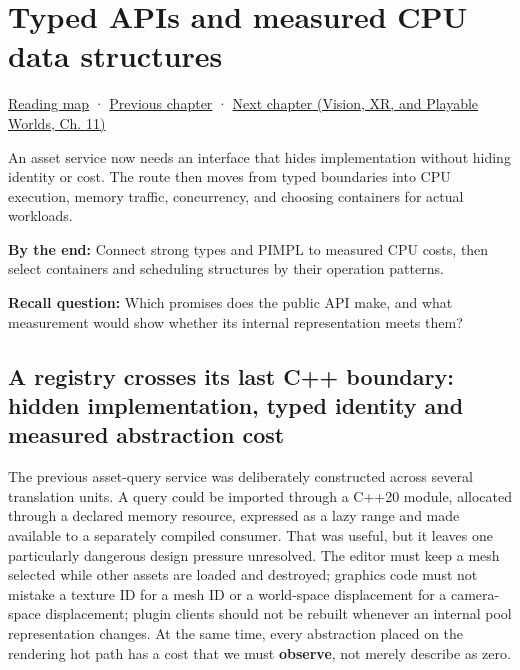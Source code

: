 \chapter{Typed APIs and measured CPU data structures}\label{05-engine-i-ch007-typed-apis-and-measured-cpu-data-structures}\hypertarget{05-engine-i-ch007}{}\label{stagechapter:05-engine-i-ch007}

\hyperref[volume-reading-map]{Reading map} · \hyperref[05-engine-i-ch006-queries-lazy-ranges-allocators-and-module-boundaries]{Previous chapter} · \href{../07-Vision-XR-and-Playable-Worlds/main.pdf\#nameddest=05-engine-i-ch008-algorithms-application-boundaries-and-a-first-playable}{Next chapter (Vision, XR, and Playable Worlds, Ch. 11)}

An asset service now needs an interface that hides implementation without hiding identity or cost. The route then moves from typed boundaries into CPU execution, memory traffic, concurrency, and choosing containers for actual workloads.

\textbf{By the end:} Connect strong types and PIMPL to measured CPU costs, then select containers and scheduling structures by their operation patterns.

\textbf{Recall question:} Which promises does the public API make, and what measurement would show whether its internal representation meets them?

\section{A registry crosses its last C++ boundary: hidden implementation, typed identity and measured abstraction cost}\label{05-engine-i-ch007-a-registry-crosses-its-last-c-boundary-hidden-implementation-typed-identity-and-measured-abstraction-cost}

The previous asset-query service was deliberately constructed across several translation units. A query could be imported through a C++20 module, allocated through a declared memory resource, expressed as a lazy range and made available to a separately compiled consumer. That was useful, but it leaves one particularly dangerous design pressure unresolved. The editor must keep a mesh selected while other assets are loaded and destroyed; graphics code must not mistake a texture ID for a mesh ID or a world-space displacement for a camera-space displacement; plugin clients should not be rebuilt whenever an internal pool representation changes. At the same time, every abstraction placed on the rendering hot path has a cost that we must \textbf{observe}, not merely describe as zero.

